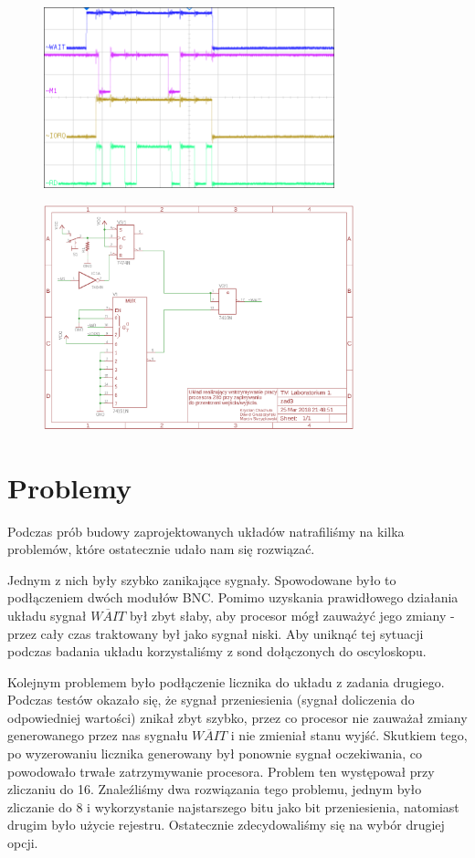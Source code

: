 \documentclass[fleqn]{article}
\begin{document}
\begin{figure}[H]
	\centering
	\includegraphics[width=0.75\textwidth]{img/3c.png}
	\caption{}
\end{figure}

\begin{figure}[H]
	\centering
	\includegraphics[width=0.8\textwidth]{img/z3.png}
	\caption{}
\end{figure}

\section{Problemy}

Podczas prób budowy zaprojektowanych układów natrafiliśmy na kilka problemów, które ostatecznie udało nam się rozwiązać.

Jednym z nich były szybko zanikające sygnały. Spowodowane było to podłączeniem dwóch modułów BNC. Pomimo uzyskania prawidłowego działania układu sygnał $\overline{WAIT}$ był zbyt słaby, aby procesor mógł zauważyć jego zmiany - przez cały czas traktowany był jako sygnał niski. Aby uniknąć tej sytuacji podczas badania układu korzystaliśmy z sond dołączonych do oscyloskopu.

Kolejnym problemem było podłączenie licznika do układu z zadania drugiego. Podczas testów okazało się, że sygnał przeniesienia (sygnał doliczenia do odpowiedniej wartości) znikał zbyt szybko, przez co procesor nie zauważał zmiany generowanego przez nas sygnału $\overline{WAIT}$ i nie zmieniał stanu wyjść. Skutkiem tego, po wyzerowaniu licznika generowany był ponownie sygnał oczekiwania, co powodowało trwałe zatrzymywanie procesora. Problem ten występował przy zliczaniu do 16. Znaleźliśmy dwa rozwiązania tego problemu, jednym było zliczanie do 8 i wykorzystanie najstarszego bitu jako bit przeniesienia, natomiast drugim było użycie rejestru. Ostatecznie zdecydowaliśmy się na wybór drugiej opcji.
\end{document}
